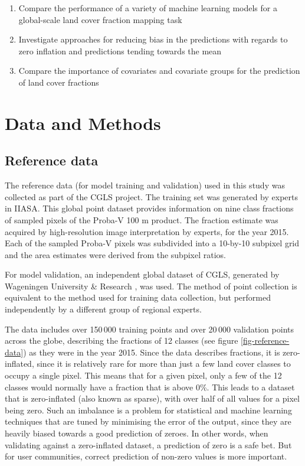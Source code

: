 \documentclass[a4paper,10pt]{article}
\begin{document}
\begin{enumerate}
 \item Compare the performance of a variety of machine learning models for a global-scale land cover fraction mapping task
 \item Investigate approaches for reducing bias in the predictions with regards to zero inflation and predictions tending towards the mean
 \item Compare the importance of covariates and covariate groups for the prediction of land cover fractions
\end{enumerate}


\section{Data and Methods}

\subsection{Reference data}

The reference data (for model training and validation) used in this study was collected as part of the \ac{CGLS} project.
The training set was generated by experts in \ac{IIASA}.
This global point dataset provides information on nine class fractions of sampled pixels of the Proba-V 100 m product.
The fraction estimate was acquired by high-resolution image interpretation by experts, for the year 2015.
Each of the sampled Proba-V pixels was subdivided into a 10-by-10 subpixel grid and the area estimates were derived from the subpixel ratios.

For model validation, an independent global dataset of \ac{CGLS}, generated by Wageningen University \& Research \citep{tsendbazar_developing_2018}, was used.
The method of point collection is equivalent to the method used for training data collection, but performed independently by a different group of regional experts.

The data includes over 150\,000 training points and over 20\,000 validation points across the globe, describing the fractions of 12 classes (see figure \ref{fig-reference-data}) as they were in the year 2015.
Since the data describes fractions, it is zero-inflated, since it is relatively rare for more than just a few land cover classes to occupy a single pixel.
This means that for a given pixel, only a few of the 12 classes would normally have a fraction that is above 0\%.
This leads to a dataset that is zero-inflated (also known as sparse), with over half of all values for a pixel being zero.
Such an imbalance is a problem for statistical and machine learning techniques that are tuned by minimising the error of the output, since they are heavily biased towards a good prediction of zeroes.
In other words, when validating against a zero-inflated dataset, a prediction of zero is a safe bet.
But for user communities, correct prediction of non-zero values is more important.
\end{document}

